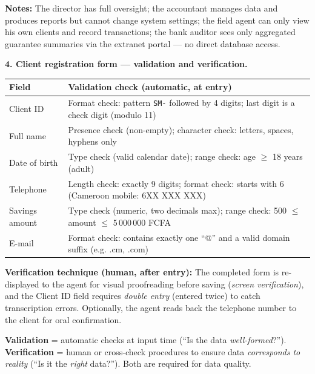 \documentclass[11pt]{article}
\begin{document}
\textbf{Notes:} The director has full oversight; the accountant manages data and produces reports but cannot change system settings; the field agent can only view his own clients and record transactions; the bank auditor sees only aggregated guarantee summaries via the extranet portal — no direct database access.

\textbf{4. Client registration form — validation and verification.}

\begin{center}
\begin{tabularx}{\linewidth}{|l|X|}
\hline
\rowcolor{popblueL} \textbf{Field} & \textbf{Validation check (automatic, at entry)} \\
\hline
Client ID & Format check: pattern \texttt{SM-} followed by 4 digits; last digit is a check digit (modulo 11) \\
\hline
Full name & Presence check (non-empty); character check: letters, spaces, hyphens only \\
\hline
Date of birth & Type check (valid calendar date); range check: age $\geq$ 18 years (adult) \\
\hline
Telephone & Length check: exactly 9 digits; format check: starts with 6 (Cameroon mobile: 6XX XXX XXX) \\
\hline
Savings amount & Type check (numeric, two decimals max); range check: 500 $\leq$ amount $\leq$ 5\,000\,000 FCFA \\
\hline
E-mail & Format check: contains exactly one ``@'' and a valid domain suffix (e.g. .cm, .com) \\
\hline
\end{tabularx}
\end{center}

\textbf{Verification technique (human, after entry):} The completed form is re-displayed to the agent for visual proofreading before saving (\emph{screen verification}), and the Client ID field requires \emph{double entry} (entered twice) to catch transcription errors. Optionally, the agent reads back the telephone number to the client for oral confirmation.

\begin{aretenir}
\textbf{Validation} = automatic checks at input time (``Is the data \emph{well-formed}?''). \textbf{Verification} = human or cross-check procedures to ensure data \emph{corresponds to reality} (``Is it the \emph{right} data?''). Both are required for data quality.
\end{aretenir}
\end{document}
